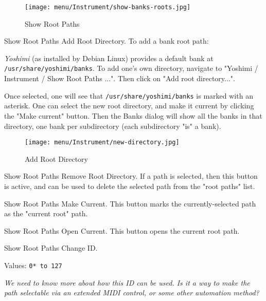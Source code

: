 \begin{figure}[H]
   \centering 
   \texttt{[image: menu/Instrument/show-banks-roots.jpg]}
   \caption[Show Root Paths]{Show Root Paths}
   \label{fig:show_banks_roots}
\end{figure}

   \setcounter{ItemCounter}{0}      %

   Show Root Paths Add Root Directory.
   To add a bank root path:

   \textsl{Yoshimi} (as installed by Debian Linux) provides a default bank at
   \texttt{/usr/share/yoshimi/banks}.
   To add one's own directory, navigate to "Yoshimi / Instrument / Show Root
   Paths ...".  Then click on "Add root directory...".

   Once selected, one will see that \texttt{/usr/share/yoshimi/banks}
   is marked with an asterisk.  One can select the new root directory,
   and make it current by clicking the "Make current" button.
   Then the Banks dialog will show all the banks in that directory, one bank
   per subdirectory (each subdirectory "is" a bank).

\begin{figure}[H]
   \centering 
   \texttt{[image: menu/Instrument/new-directory.jpg]}
   \caption{Add Root Directory}
   \label{fig:add_root_directory}
\end{figure}

   Show Root Paths Remove Root Directory.
   If a path is selected, then this button is active, and can be used to
   delete the selected path from the "root paths" list.

   Show Root Paths Make Current.
   This button marks the currently-selected path as the "current root" path.

   Show Root Paths Open Current.
   This button opens the current root path.

   Show Root Paths Change ID.

   Values: \texttt{0* to 127}

   \textsl{
   We need to know more about how this ID can be used.
   Is it a way to make the path selectable via an extended MIDI control, or
   some other automation method?
   }

